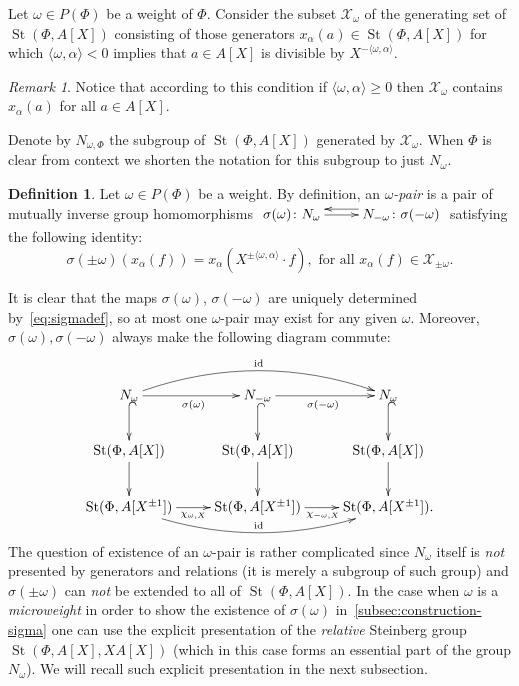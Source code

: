 \documentclass[oneside, 10pt]{amsart}
\DeclareMathOperator{\St}{St}
\numberwithin{equation}{section}
\numberwithin{thm}{section}
\numberwithin{lemma}{section}
\theoremstyle{definition}
\newtheorem{dfn}[lemma]{Definition}
\theoremstyle{remark}
\newtheorem{rem}[lemma]{Remark}
\begin{document}
Let $\omega \in P(\Phi)$ be a weight of $\Phi$.
Consider the subset $\mathcal{X}_\omega$ of the generating set of $\St(\Phi, A[X])$ consisting of those generators $x_{\alpha}(a) \in \St(\Phi, A[X])$ for which
$\langle \omega, \alpha\rangle < 0$ implies that $a \in A[X]$ is divisible by $X^{-\langle \omega, \alpha\rangle}$.
\begin{rem}
Notice that according to this condition if $\langle \omega, \alpha\rangle \geq 0$ then $\mathcal{X}_\omega$ contains $x_\alpha(a)$ for all $a \in A[X]$.
\end{rem}
Denote by $N_{\omega, \Phi}$ the subgroup of $\St(\Phi, A[X])$ generated by $\mathcal{X}_\omega$.
When $\Phi$ is clear from context we shorten the notation for this subgroup to just $N_\omega$.

\begin{dfn} \label{dfn:delta-pair}
Let $\omega \in P(\Phi)$ be a weight.
By definition, an {\it $\omega$-pair} is a pair of mutually inverse group homomorphisms
$\xymatrix{ \sigma(\omega)\colon N_\omega \ar[r] & \ar@<-1.0ex>[l] N_{-\omega}\colon \sigma(-\omega) }$ satisfying the following identity:
\begin{equation} \label{eq:sigmadef}
\sigma(\pm \omega)(x_\alpha(f)) = x_\alpha(X^{\pm\langle\omega, \alpha\rangle}\cdot f),
\text{ for all } x_\alpha(f) \in \mathcal{X}_{\pm\omega}.
\end{equation}\end{dfn}
It is clear that the maps $\sigma(\omega)$, $\sigma(-\omega)$ are uniquely determined by~\eqref{eq:sigmadef}, so at most one $\omega$-pair may exist for any given $\omega$.
Moreover, $\sigma(\omega), \sigma(-\omega)$ always make the following diagram commute:
\begin{equation} \label{eq:sigma-diagram}
\xymatrix{ N_\omega \ar[r]_{\sigma(\omega)}\ar@{^{(}->}[d] \ar@/^1.5pc/[rr]^{\mathrm{id}} & N_{-\omega} \ar@{^{(}->}[d] \ar[r]_{\sigma(-\omega)} & N_\omega \ar@{^{(}->}[d] \\
\St(\Phi, A[X]) \ar[d] & \St(\Phi, A[X]) \ar[d] & \St(\Phi, A[X]) \ar[d] \\
\St(\Phi, A[X^{\pm 1}]) \ar@<-0.0ex>[r]_{\chi_{\omega, X}} \ar@/_1.5pc/[rr]^{\mathrm{id}} & \St(\Phi, A[X^{\pm 1}]) \ar@<-0.0ex>[r]_{\chi_{-\omega, X}} & \St(\Phi, A[X^{\pm 1}]).} \end{equation}
The question of existence of an $\omega$-pair is rather complicated since $N_\omega$ itself is \textit{not} presented by generators and relations
(it is merely a subgroup of such group) and $\sigma(\pm \omega)$ can \textit{not} be extended to all of $\St(\Phi, A[X])$.
In the case when $\omega$ is a \textit{microweight} in order to show the existence of $\sigma(\omega)$ in~\cref{subsec:construction-sigma} one can use
the explicit presentation of the \textit{relative} Steinberg group $\St(\Phi, A[X], XA[X])$
(which in this case forms an essential part of the group $N_\omega$).
We will recall such explicit presentation in the next subsection.
\end{document}
